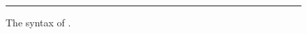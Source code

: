 \begin{figure}[tb]
\begin{minipage}{\textwidth}
\begin{align*}
      \end{align*}
    \end{minipage}
  \medskip
  \hrule
  \caption{The syntax of \vlmini{}.}
  \label{syntax:vlmini}
\end{figure}